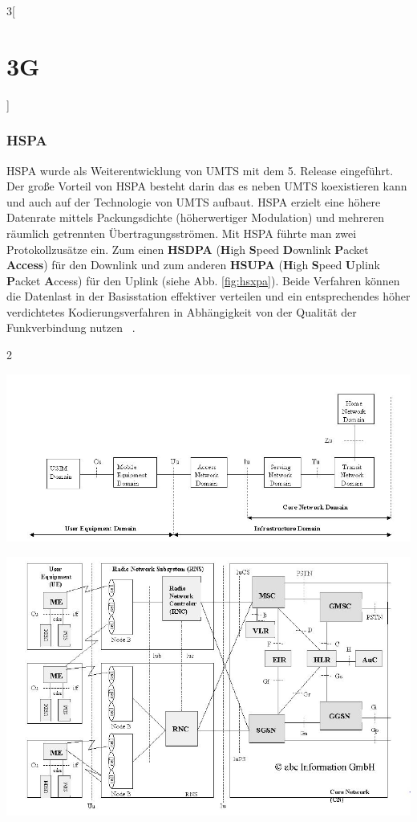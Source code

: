\begin{multicols}{3}[\section{3G}]
\subsubsection*{HSPA}
HSPA wurde als Weiterentwicklung von UMTS mit dem 5. Release eingeführt. Der große Vorteil von HSPA besteht darin das es neben UMTS koexistieren kann und auch auf der Technologie von UMTS aufbaut. HSPA erzielt eine höhere Datenrate mittels Packungsdichte (höherwertiger Modulation) und mehreren räumlich getrennten Übertragungsströmen. Mit HSPA führte man zwei Protokollzusätze ein. Zum einen \textbf{HSDPA} (\textbf{H}igh \textbf{S}peed \textbf{D}ownlink \textbf{P}acket \textbf{Access}) für den Downlink und zum anderen \textbf{HSUPA} (\textbf{H}igh \textbf{S}peed \textbf{U}plink \textbf{P}acket \textbf{A}ccess) für den Uplink (siehe Abb. \ref{fig:hsxpa}). Beide Verfahren können die Datenlast in der Basisstation effektiver verteilen und ein entsprechendes höher verdichtetes Kodierungsverfahren in Abhängigkeit von der Qualität der Funkverbindung nutzen ~\cite{3G.8}.

\end{multicols}
\begin{multicols}{2}

\begin{Figure}
\includegraphics[width=\linewidth]{Kapitel/3G/Grafiken/Domains.jpg}
\label{fig:domains}
\end{Figure}

\begin{Figure}
\includegraphics[width=\linewidth]{Kapitel/3G/Grafiken/Architektur.png}
\label{fig:architektur}
\end{Figure}

\end{multicols}

